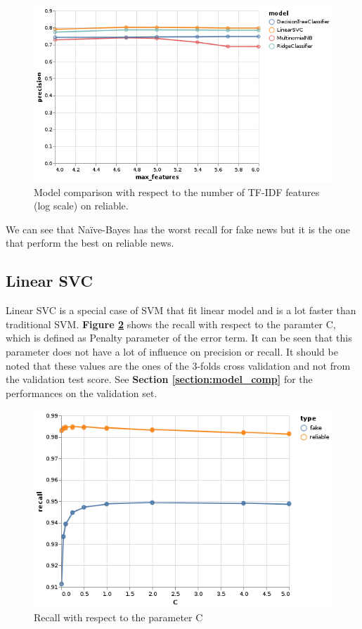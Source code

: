 \documentclass[11pt,a4paper,oneside]{report}
\begin{document}
\begin{figure}[h]
	\centering
	\includegraphics[width=\textwidth]{output/all_reliable_precision.png}
	\caption{Model comparison with respect to the number of TF-IDF features (log scale) on reliable.}
	\label{fig:all_precision_reliable}
\end{figure}

We can see that Naïve-Bayes has the worst recall for fake news but it is the one that perform the best on reliable news. 

\subsection{Linear SVC}
Linear SVC is a special case of SVM that fit linear model and is a lot faster than traditional SVM. \textbf{Figure \ref{fig:LinearSVC_recall}} shows the recall with respect to the paramter C, which is defined as Penalty parameter of the error term. It can be seen that this parameter does not have a lot of influence on precision or recall. It should be noted that these values are the ones of the 3-folds cross validation and not from the validation test score. See \textbf{Section \ref{section:model_comp}} for the performances on the validation set. 

\begin{figure}[h]
	\centering
	\includegraphics[width=\textwidth]{output/LinearSVC_recall.png}
	\caption{Recall with respect to the parameter C}
	\label{fig:LinearSVC_recall}
\end{figure}
\end{document}
